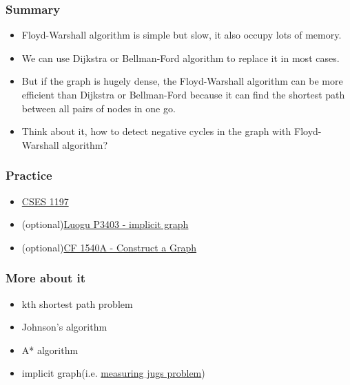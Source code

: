 \documentclass[xcolor=dvipsnames]{beamer}
\begin{document}
    \begin{frame}
        \frametitle{Summary}
        \begin{itemize}
            \item Floyd-Warshall algorithm is simple but slow, it also occupy lots of memory.

            \item We can use Dijkstra or Bellman-Ford algorithm to replace it in most cases.

            \item But if the graph is hugely dense,
            the Floyd-Warshall algorithm can be more efficient than Dijkstra or Bellman-Ford
            because it can find the shortest path between all pairs of nodes in one go.
            \item Think about it, how to detect negative cycles in the graph with Floyd-Warshall algorithm?
        \end{itemize}
    \end{frame}
        \begin{frame}
        \frametitle{Practice}
        \begin{itemize}
            \item \href{https://cses.fi/problemset/task/1197}{CSES 1197}
            \item (optional)\href{https://www.luogu.com.cn/problem/P3403}{Luogu P3403 - implicit graph}
            \item (optional)\href{https://codeforces.com/problemset/problem/1540/A}{CF 1540A - Construct a Graph}
        \end{itemize}
    \end{frame}
    \begin{frame}
        \frametitle{More about it}
        \begin{itemize}
            \item kth shortest path problem
            \item Johnson's algorithm
            \item A* algorithm
            \item implicit graph(i.e. \href{https://leetcode.com/problems/water-and-jug-problem/description/}{measuring jugs problem})
        \end{itemize}
    \end{frame}
\end{document}
